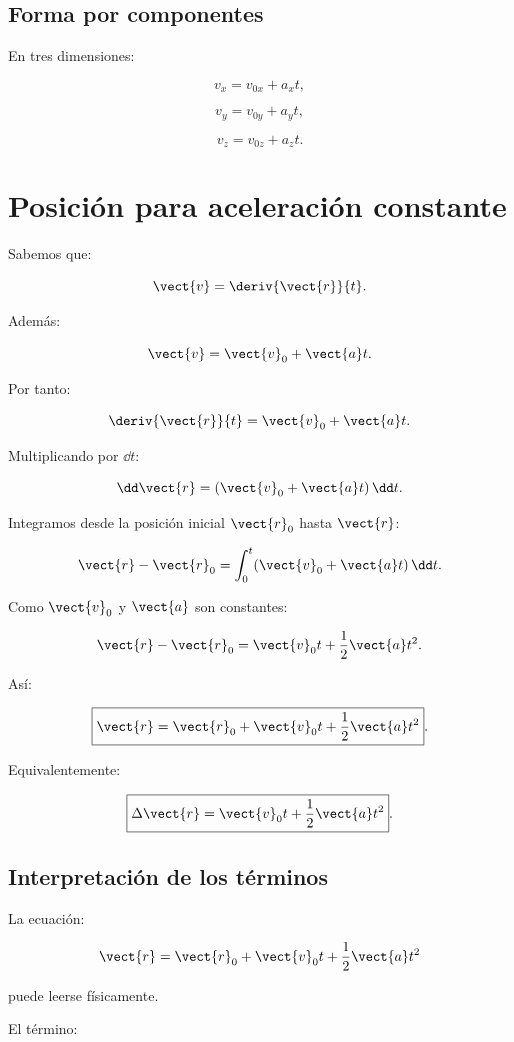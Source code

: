 \subsection{Forma por componentes}

En tres dimensiones:

\[
\boxed{
v_x=v_{0x}+a_xt
},
\]

\[
\boxed{
v_y=v_{0y}+a_yt
},
\]

\[
\boxed{
v_z=v_{0z}+a_zt
}.
\]


\section{Posición para aceleración constante}

Sabemos que:

\[
\vect{v}
=
\deriv{\vect{r}}{t}.
\]

Además:

\[
\vect{v}
=
\vect{v}_0+\vect{a}t.
\]

Por tanto:

\[
\deriv{\vect{r}}{t}
=
\vect{v}_0+\vect{a}t.
\]

Multiplicando por \(\dd t\):

\[
\dd\vect{r}
=
(\vect{v}_0+\vect{a}t)\,\dd t.
\]

Integramos desde la posición inicial \(\vect{r}_0\) hasta \(\vect{r}\):

\[
\vect{r}-\vect{r}_0
=
\int_0^t
(\vect{v}_0+\vect{a}t)\,\dd t.
\]

Como \(\vect{v}_0\) y \(\vect{a}\) son constantes:

\[
\vect{r}-\vect{r}_0
=
\vect{v}_0t+\frac{1}{2}\vect{a}t^2.
\]

Así:

\[
\boxed{
\vect{r}
=
\vect{r}_0
+
\vect{v}_0t
+
\frac{1}{2}\vect{a}t^2
}.
\]

Equivalentemente:

\[
\boxed{
\Delta\vect{r}
=
\vect{v}_0t
+
\frac{1}{2}\vect{a}t^2
}.
\]


\subsection{Interpretación de los términos}

La ecuación:

\[
\vect{r}
=
\vect{r}_0
+
\vect{v}_0t
+
\frac{1}{2}\vect{a}t^2
\]

puede leerse físicamente.

El término:


